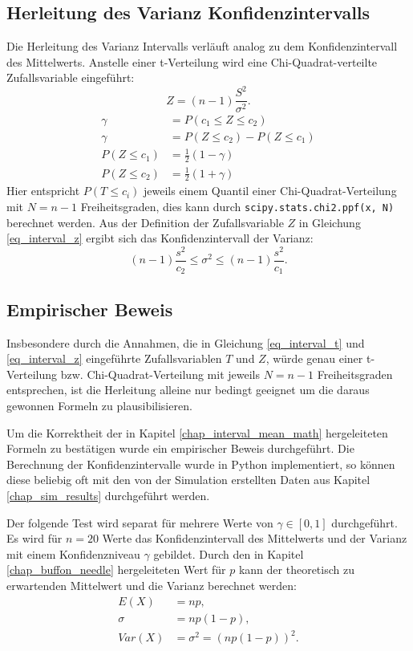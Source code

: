 \documentclass[10pt,twocolumn]{scrartcl}
\begin{document}
	\subsection{Herleitung des Varianz Konfidenzintervalls}
		\label{chap_interval_var_math}
		Die Herleitung des Varianz Intervalls verläuft analog zu dem Konfidenzintervall  des Mittelwerts. Anstelle einer t-Verteilung wird eine Chi-Quadrat-verteilte Zufallsvariable eingeführt:
		\begin{equation} \label{eq_interval_z}
		Z = (n-1)\frac{S^2}{\sigma^2} .
		\end{equation}
		\begin{align}
		\gamma &= P(c_1 \le Z \le c_2) \\
		\gamma &= P(Z \le c_2) - P(Z \le c_1) \nonumber \\
		P(Z \le c_1) &= \frac{1}{2} (1-\gamma) \\
		P(Z \le c_2) &= \frac{1}{2} (1+\gamma)
		\end{align}
		Hier entspricht $P(T \le c_i)$ jeweils einem Quantil einer Chi-Quadrat-Verteilung mit $N = n-1$ Freiheitsgraden, dies kann durch \texttt{scipy.stats.chi2.ppf(x, N)}\cite{scipy} berechnet werden.
		Aus der Definition der Zufallsvariable $Z$ in Gleichung \ref{eq_interval_z} ergibt sich das Konfidenzintervall der Varianz:
		\begin{equation}
		(n-1)  \frac{s^2}{c_2} \le \sigma^2 \le (n-1)  \frac{s^2}{c_1}.
		\end{equation}

	\subsection{Empirischer Beweis}
		\label{chap_interval_prove}
		Insbesondere durch die Annahmen, die in Gleichung \ref{eq_interval_t} und \ref{eq_interval_z} eingeführte  Zufallsvariablen $T$ und $Z$, würde genau einer t-Verteilung bzw. Chi-Quadrat-Verteilung mit jeweils $N = n-1$ Freiheitsgraden entsprechen, ist die Herleitung alleine nur bedingt geeignet um die daraus gewonnen Formeln zu plausibilisieren.

		Um die Korrektheit der in Kapitel \ref{chap_interval_mean_math} hergeleiteten Formeln zu bestätigen wurde ein empirischer Beweis durchgeführt. Die Berechnung der Konfidenzintervalle wurde in Python implementiert, so können diese beliebig oft mit den von der Simulation erstellten Daten aus Kapitel \ref{chap_sim_results} durchgeführt werden.

		Der folgende Test wird separat für mehrere Werte von $\gamma \in [0, 1]$ durchgeführt. Es wird für $n = 20$ Werte das Konfidenzintervall des Mittelwerts und der Varianz mit einem Konfidenzniveau $\gamma$ gebildet. Durch den in Kapitel \ref{chap_buffon_needle} hergeleiteten Wert für $p$ kann der theoretisch zu erwartenden Mittelwert und die Varianz berechnet werden:
		\begin{align}
		E(X) &= n p , \\
		\sigma &= n p (1-p) , \nonumber \\
		Var(X) &= \sigma^2 = (n p (1-p))^2 .
		\end{align}
\end{document}
